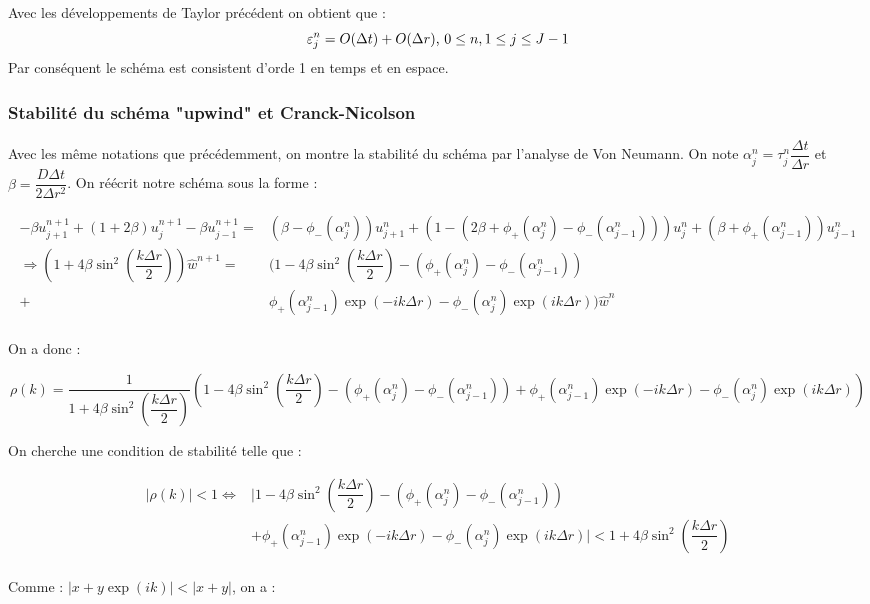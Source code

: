 \documentclass[a4paper,fleqn,leqno]{article}
\begin{document}
Avec les développements de Taylor précédent on obtient que :
\[\varepsilon^n_j = O(\Delta t) + O(\Delta r)$, $ 0\leq n, 1\leq j\leq J-1\]
Par conséquent le schéma est consistent d'orde 1 en temps et en espace.

\subsubsection{Stabilité du schéma "upwind" et Cranck-Nicolson}

Avec les même notations que précédemment, on montre la stabilité du schéma par l'analyse de Von Neumann.
On note $\alpha^n_j = \tau^n_j\dfrac{\Delta t}{\Delta r}$ et $\beta = \dfrac{D\Delta t}{2\Delta r^2}$. On réécrit notre schéma sous la forme :

\begin{equation*}
\begin{array}{rl}
-\beta u^{n+1}_{j+1} + (1+2\beta) u^{n+1}_j -\beta u^{n+1}_{j-1} = &(\beta - \phi_-(\alpha^n_j)) u^n_{j+1} + (1-(2\beta + \phi_+(\alpha^n_j)- \phi_-(\alpha^n_{j-1}))) u^n_j + (\beta + \phi_+(\alpha^n_{j-1})) u^n_{j-1}\\
\Rightarrow (1 + 4\beta\sin^2(\dfrac{k\Delta r}{2}))\hat{w}^{n+1} = & (1 - 4\beta\sin^2(\dfrac{k\Delta r}{2}) -(\phi_+(\alpha^n_j)- \phi_-(\alpha^n_{j-1})) \\
 +& \phi_+(\alpha^n_{j-1}) \exp(-ik\Delta r) - \phi_-(\alpha^n_j) \exp(ik\Delta r))\hat{w}^n\\
\end{array}
\end{equation*}

On a donc :

\[\rho(k) = \dfrac{1}{1 + 4\beta\sin^2(\dfrac{k\Delta r}{2})} (1 - 4\beta\sin^2(\dfrac{k\Delta r}{2}) -(\phi_+(\alpha^n_j)- \phi_-(\alpha^n_{j-1})) + \phi_+(\alpha^n_{j-1}) \exp(-ik\Delta r) - \phi_-(\alpha^n_j) \exp(ik\Delta r))\]

On cherche une condition de stabilité telle que :

\begin{align*}
\lvert\rho(k)\rvert < 1 \Leftrightarrow & \lvert 1 - 4\beta\sin^2(\dfrac{k\Delta r}{2}) -(\phi_+(\alpha^n_j)- \phi_-(\alpha^n_{j-1})) \\
& + \phi_+(\alpha^n_{j-1}) \exp(-ik\Delta r) - \phi_-(\alpha^n_j) \exp(ik\Delta r) \rvert <  1 + 4\beta\sin^2(\dfrac{k\Delta r}{2})\\
\end{align*}

Comme : $\lvert x + y\exp(ik)\rvert < \lvert x+ y \rvert$, on a :
\end{document}
